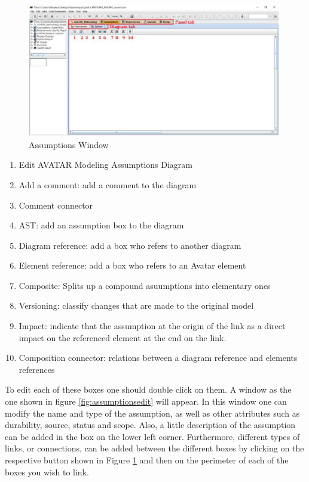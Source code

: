 \documentclass[12pt]{article}
\begin{document}
\begin{figure}[htbp]
\centering
\includegraphics[width=0.99\textwidth]{fig/assumptionswindow.jpg}
\caption{Assumptions Window} \label{fig:assumptionswindow}
\end{figure}

\begin{enumerate}
\item Edit AVATAR Modeling Assumptions Diagram
\item  Add a comment: add a comment to the diagram
\item  Comment connector
\item  AST: add an assumption box to the diagram
\item  Diagram reference: add a box who refers to another diagram
\item  Element reference: add a box who refers to an Avatar element
\item  Composite: Splits up a compound asuumptions into elementary ones
\item  Versioning: classify changes that are made to the original model
\item  Impact: indicate that the assumption at the origin of the link as a direct impact on the referenced element at the end on the link. 
\item Composition connector: relations between a diagram reference and elements references
\end{enumerate}

To edit each of these boxes one should double click on them. A window as the one shown in figure \ref{fig:assumptionsedit} will appear. In this window one can modify the name and type of the assumption, as well as other attributes such as durability, source, status and scope. Also, a little description of the assumption can be added in the box on the lower left corner. Furthermore, different types of links, or connections, can be added between the different boxes by clicking on the respective button shown in Figure \ref{fig:assumptionswindow} and then on the perimeter of each of the boxes you wish to link. 
\end{document}
